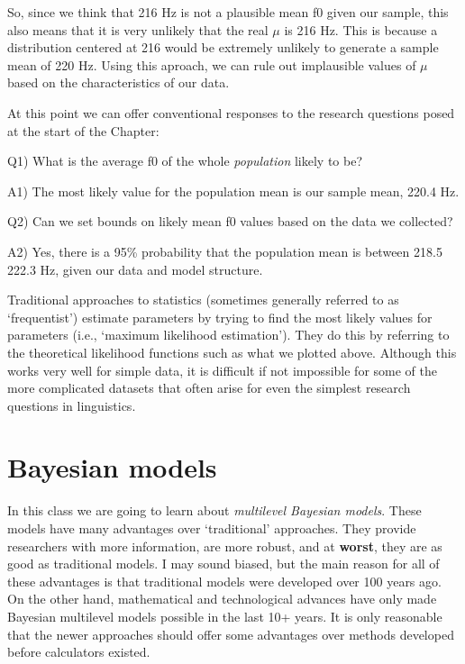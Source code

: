 \documentclass[
]{book}
\begin{document}
So, since we think that 216 Hz is not a plausible mean f0 given our sample, this also means that it is very unlikely that the real \(\mu\) is 216 Hz. This is because a distribution centered at 216 would be extremely unlikely to generate a sample mean of 220 Hz. Using this aproach, we can rule out implausible values of \(\mu\) based on the characteristics of our data.

At this point we can offer conventional responses to the research questions posed at the start of the Chapter:

Q1) What is the average f0 of the whole \emph{population} likely to be?

A1) The most likely value for the population mean is our sample mean, 220.4 Hz.

Q2) Can we set bounds on likely mean f0 values based on the data we collected?

A2) Yes, there is a 95\% probability that the population mean is between 218.5 222.3 Hz, given our data and model structure.

Traditional approaches to statistics (sometimes generally referred to as `frequentist') estimate parameters by trying to find the most likely values for parameters (i.e., `maximum likelihood estimation'). They do this by referring to the theoretical likelihood functions such as what we plotted above. Although this works very well for simple data, it is difficult if not impossible for some of the more complicated datasets that often arise for even the simplest research questions in linguistics.

\hypertarget{bayesian-models}{%
\section{Bayesian models}\label{bayesian-models}}

In this class we are going to learn about \emph{multilevel Bayesian models}. These models have many advantages over `traditional' approaches. They provide researchers with more information, are more robust, and at \textbf{worst}, they are as good as traditional models. I may sound biased, but the main reason for all of these advantages is that traditional models were developed over 100 years ago. On the other hand, mathematical and technological advances have only made Bayesian multilevel models possible in the last 10+ years. It is only reasonable that the newer approaches should offer some advantages over methods developed before calculators existed.
\end{document}
